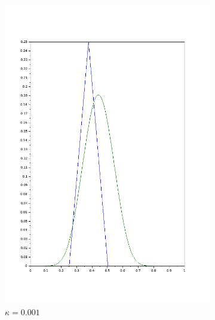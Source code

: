 \documentclass{article}
\begin{document}
\begin{figure}
\begin{subfigure}[b]{0.3\textwidth}
		\includegraphics[width=\textwidth]{conv_kappa_0,001.pdf}
		\caption{$\kappa=0.001$}
	\end{subfigure}
	\quad
	\begin{subfigure}[b]{0.3\textwidth}

\end{subfigure}
\end{figure}
\end{document}
